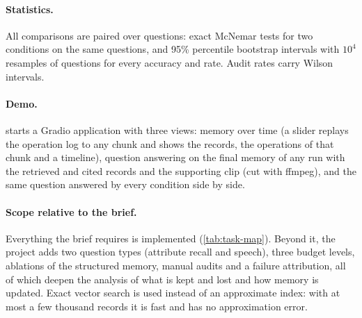 \paragraph{Statistics.}
All comparisons are paired over questions: exact McNemar tests for two
conditions on the same questions, and 95\% percentile bootstrap intervals with
$10^4$ resamples of questions for every accuracy and rate. Audit rates carry
Wilson intervals.

\paragraph{Demo.}
 starts a Gradio application with three views: memory over
time (a slider replays the operation log to any chunk and shows the records,
the operations of that chunk and a timeline), question answering on the final
memory of any run with the retrieved and cited records and the supporting clip
(cut with ffmpeg), and the same question answered by every condition side by
side.

\paragraph{Scope relative to the brief.}
Everything the brief requires is implemented (\cref{tab:task-map}). Beyond it,
the project adds two question types (attribute recall and speech), three
budget levels, ablations of the structured memory, manual audits and a failure
attribution, all of which deepen the analysis of what is kept and lost and how
memory is updated. Exact vector search is used instead of an approximate index:
with at most a few thousand records it is fast and has no approximation error.
